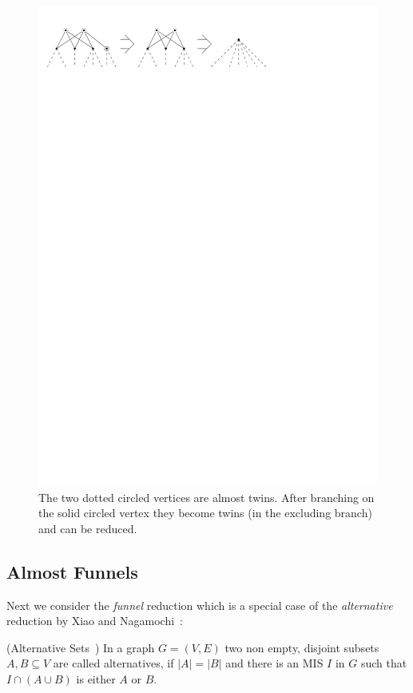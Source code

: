 \documentclass[a4paper,UKenglish,cleveref, autoref, thm-restate]{lipics-v2021}
\begin{document}
\begin{figure}[t]
  \centering
  \includegraphics[scale=1]{figures/twin}
  \caption{The two dotted circled vertices are almost twins. After branching on
  the solid circled vertex they become twins (in the excluding branch) and can
  be reduced.}
  \label{fig:twin}
\end{figure}

\subsection{Almost Funnels}
\label{sec:almost_funnels}

Next we consider the \emph{funnel} reduction which is a special case of the
\emph{alternative} reduction by Xiao and Nagamochi~\cite{XiaoUnconfined}:

\begin{definition} (Alternative Sets~\cite{XiaoUnconfined})
	In a graph $G=(V,E)$ two non empty, disjoint subsets $A,B\subseteq V$ are
    called alternatives, if $|A| = |B|$ and there is an MIS $I$ in $G$ such that $I\cap(A\cup B)$ is either $A$ or $B$.
\end{definition}
\end{document}
